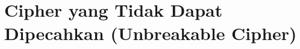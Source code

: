 \documentclass[../main.tex]{subfiles}
\begin{document}
\chapter{Cipher yang Tidak Dapat Dipecahkan (Unbreakable Cipher)}
\end{document}
